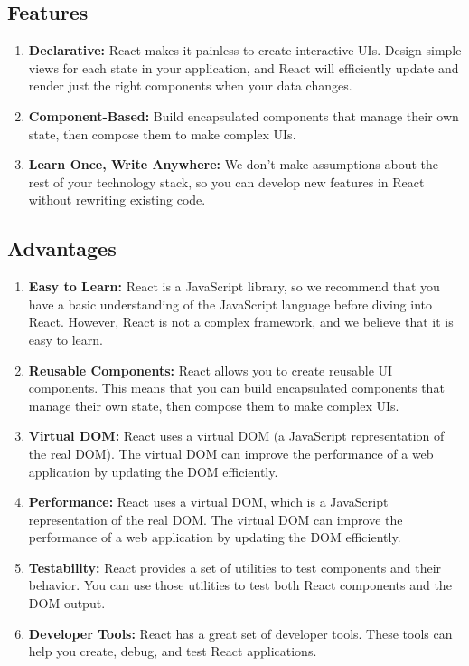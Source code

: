 \documentclass[11pt]{article}
\begin{document}
\subsection{Features}
\begin{enumerate}
    \item \textbf{Declarative:} React makes it painless to create interactive UIs. Design simple views for each state in your application, and React will efficiently update and render just the right components when your data changes.
    \item \textbf{Component-Based:} Build encapsulated components that manage their own state, then compose them to make complex UIs.
    \item \textbf{Learn Once, Write Anywhere:} We don’t make assumptions about the rest of your technology stack, so you can develop new features in React without rewriting existing code.
\end{enumerate}

\subsection{Advantages}
\begin{enumerate}
    \item \textbf{Easy to Learn:} React is a JavaScript library, so we recommend that you have a basic understanding of the JavaScript language before diving into React. However, React is not a complex framework, and we believe that it is easy to learn.
    \item \textbf{Reusable Components:} React allows you to create reusable UI components. This means that you can build encapsulated components that manage their own state, then compose them to make complex UIs.
    \item \textbf{Virtual DOM:} React uses a virtual DOM (a JavaScript representation of the real DOM). The virtual DOM can improve the performance of a web application by updating the DOM efficiently.
    \item \textbf{Performance:} React uses a virtual DOM, which is a JavaScript representation of the real DOM. The virtual DOM can improve the performance of a web application by updating the DOM efficiently.
    \item \textbf{Testability:} React provides a set of utilities to test components and their behavior. You can use those utilities to test both React components and the DOM output.
    \item \textbf{Developer Tools:} React has a great set of developer tools. These tools can help you create, debug, and test React applications.
\end{enumerate}
\end{document}
